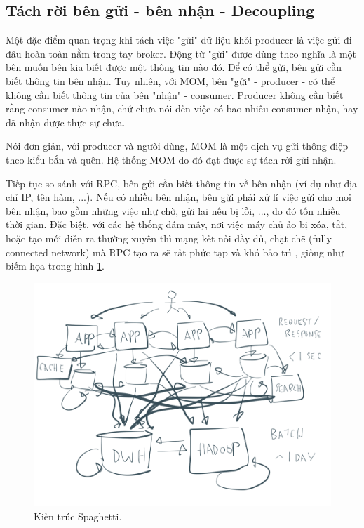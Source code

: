 \documentclass{article}
\begin{document}
\subsection{Tách rời bên gửi - bên nhận - Decoupling}

Một đặc điểm quan trọng khi tách việc "gửi" dữ liệu khỏi producer là việc gửi đi
đâu hoàn toàn nằm trong tay broker. Động từ "gửi" được dùng theo nghĩa là một
bên muốn bên kia biết được một thông tin nào đó. Để có thể gửi, bên gửi cần biết
thông tin bên nhận. Tuy nhiên, với MOM, bên "gửi" - producer - có thể không cần
biết thông tin của bên "nhận" - consumer. Producer không cần biết rằng consumer
nào nhận, chứ chưa nói đến việc có bao nhiêu consumer nhận, hay đã nhận được
thực sự chưa.

Nói đơn giản, với producer và ngưòi dùng, MOM là một dịch vụ gửi thông điệp theo
kiểu bắn-và-quên. Hệ thống MOM do đó đạt được sự tách rời gửi-nhận.

Tiếp tục so sánh với RPC, bên gửi cần biết thông tin về bên nhận (ví dụ như địa
chỉ IP, tên hàm, ...). Nếu có nhiều bên nhận, bên gửi phải xử lí việc gửi cho
mọi bên nhận, bao gồm những việc như chờ, gửi lại nếu bị lỗi, ..., do đó tốn
nhiều thời gian. Đặc biệt, với các hệ thống đám mây, nơi việc máy chủ ảo bị xóa,
tắt, hoặc tạo mới diễn ra thường xuyên thì mạng kết nối đầy đủ, chặt chẽ (fully
connected network) mà RPC tạo ra sẽ rất phức tạp và khó bảo trì
\cite{Kleppmann17C}, giống như biếm họa trong hình
\ref{spaghetti_architectures}.

\begin{figure}[H]
    \centering
    \includegraphics[scale=0.5]{spaghetti_architectures.png}
    \caption{Kiến trúc Spaghetti\texttrademark \cite{confluent2018}.}
    \label{spaghetti_architectures}
\end{figure}
\end{document}
